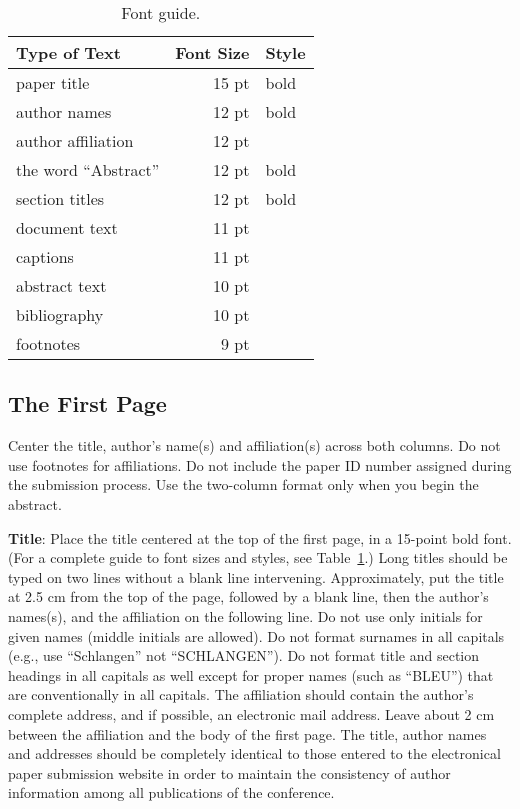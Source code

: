 \documentclass[11pt]{article}
\begin{document}
\begin{table}[h]
\begin{center}
\begin{tabular}{|l|rl|}
\hline \bf Type of Text & \bf Font Size & \bf Style \\ \hline
paper title & 15 pt & bold \\
author names & 12 pt & bold \\
author affiliation & 12 pt & \\
the word ``Abstract'' & 12 pt & bold \\
section titles & 12 pt & bold \\
document text & 11 pt  &\\
captions & 11 pt & \\
abstract text & 10 pt & \\
bibliography & 10 pt & \\
footnotes & 9 pt & \\
\hline
\end{tabular}
\end{center}
\caption{\label{font-table} Font guide. }
\end{table}

\subsection{The First Page}
\label{ssec:first}

Center the title, author's name(s) and affiliation(s) across both
columns. Do not use footnotes for affiliations. Do not include the
paper ID number assigned during the submission process. Use the
two-column format only when you begin the abstract.

{\bf Title}: Place the title centered at the top of the first page, in
a 15-point bold font. (For a complete guide to font sizes and styles, 
see Table~\ref{font-table}.) Long titles should be typed on two lines without
a blank line intervening. Approximately, put the title at 2.5 cm from
the top of the page, followed by a blank line, then the author's
names(s), and the affiliation on the following line. Do not use only
initials for given names (middle initials are allowed). Do not format surnames
in all capitals (e.g., use ``Schlangen'' not ``SCHLANGEN'').
Do not format title and section headings in all capitals as well
except for proper names (such as ``BLEU'') that are conventionally
in all capitals.
The affiliation should contain the author's complete address, and if
possible, an electronic mail address. Leave about 2 cm between the
affiliation and the body of the first page.
The title, author names and addresses should be completely
identical to those entered to the electronical paper submission
website in order to maintain the consistency of author information
among all publications of the conference.
\end{document}
